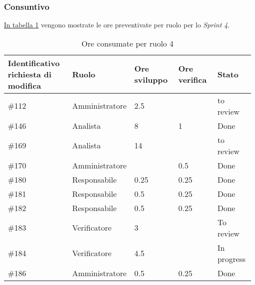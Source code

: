\subsubsection{Consuntivo}

\hyperref[tab:sprint4_ore_consumate]{In tabella \ref{tab:sprint4_ore_consumate}} vengono mostrate le ore preventivate per ruolo per lo \textit{Sprint 4}.

\begin{table}[H]
    \centering
    \begin{tabular}{| l | l | l | l | l |}
        \hline
            \makecell{\textbf{Identificativo} \\ \textbf{richiesta di modifica}} &
            \textbf{Ruolo} & 
            \textbf{Ore sviluppo} &
            \textbf{Ore verifica} & 
            \textbf{Stato}\\ 
        \hline
            \#112 & Amministratore & 2.5 & & to review\\
        \hline
            \#146 & Analista & 8 & 1 & Done\\
        \hline
            \#169 & Analista & 14 &  & to review\\
        \hline
            \#170 & Amministratore &  & 0.5 & Done \\
        \hline
            \#180 & Responsabile & 0.25 & 0.25 & Done\\
        \hline
            \#181 & Responsabile & 0.5 & 0.25 & Done\\
        \hline
            \#182 & Responsabile & 0.5 & 0.25 & Done\\
        \hline
            \#183 & Verificatore & 3 &  & To review\\
        \hline
            \#184 & Verificatore & 4.5 &  & In progress\\
        \hline
            \#186 & Amministratore & 0.5 & 0.25 & Done\\
        \hline
    \end{tabular}
    \caption{Ore consumate per ruolo  4}
    \label{tab:sprint4_ore_consumate} 
\end{table}